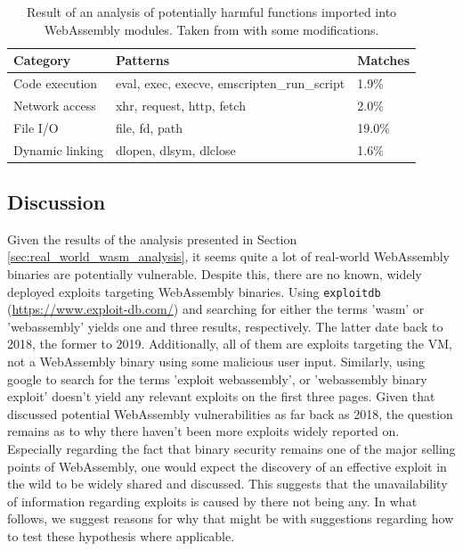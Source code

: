 \documentclass[sigconf]{acmart}
\begin{document}
\begin{table}
\caption{Result of an analysis of potentially harmful functions imported into WebAssembly modules. Taken from \cite{hilbig_empirical_2021} with some modifications.}
\label{table:analysis_import_harmful_functions}
\begin{tabular}{l|l|l}
  \toprule
  Category & Patterns & Matches\\
  \midrule
  Code execution & eval, exec, execve, emscripten\_run\_script & 1.9\% \\ \hline
  Network access & xhr, request, http, fetch & 2.0\% \\ \hline
  File I/O  & file, fd, path & 19.0\% \\ \hline
  Dynamic linking & dlopen, dlsym, dlclose  & 1.6\%
\end{tabular}
\end{table}

\subsection{Discussion}
\label{sec:discussion}
Given the results of the analysis presented in Section \ref{sec:real_world_wasm_analysis}, it seems quite a lot of real-world WebAssembly binaries are potentially vulnerable. Despite this, there are no known, widely deployed exploits targeting WebAssembly binaries. Using \texttt{exploitdb} (\url{https://www.exploit-db.com/}) and searching for either the terms 'wasm' or 'webassembly' yields one and three results, respectively. The latter date back to 2018, the former to 2019. Additionally, all of them are exploits targeting the VM, not a WebAssembly binary using some malicious user input. Similarly, using google to search for the terms 'exploit webassembly', or 'webassembly binary exploit' doesn't yield any relevant exploits on the first three pages. Given that \citet{mcfadden_security_2018} discussed potential WebAssembly vulnerabilities as far back as 2018, the question remains as to why there haven't been more exploits widely reported on. Especially regarding the fact that binary security remains one of the major selling points of WebAssembly, one would expect the discovery of an effective exploit in the wild to be widely shared and discussed. This suggests that the unavailability of information regarding exploits is caused by there not being any. In what follows, we suggest reasons for why that might be with suggestions regarding how to test these hypothesis where applicable.
\end{document}
